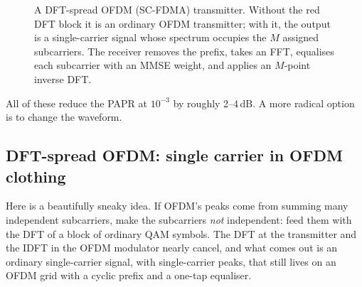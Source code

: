 \begin{figure}[H]\centering
{}
\caption{A DFT-spread OFDM (SC-FDMA) transmitter. Without the red DFT block it is an ordinary OFDM
transmitter; with it, the output is a single-carrier signal whose spectrum occupies the $M$ assigned
subcarriers. The receiver removes the prefix, takes an FFT, equalises each subcarrier with an MMSE weight,
and applies an $M$-point inverse DFT.}
\label{fig:ch17_dfts_tikz}
\end{figure}

All of these reduce the PAPR at $10^{-3}$ by roughly 2--4\,dB. A more radical option is to change the waveform.

\subsection{DFT-spread OFDM: single carrier in OFDM clothing}
\label{sec:ch17:dfts}

Here is a beautifully sneaky idea. If OFDM's peaks come from summing many independent subcarriers,
make the subcarriers \emph{not} independent: feed them with the DFT of a block of ordinary QAM
symbols. The DFT at the transmitter and the IDFT in the OFDM modulator nearly cancel, and what
comes out is an ordinary single-carrier signal, with single-carrier peaks, that still lives on an
OFDM grid with a cyclic prefix and a one-tap equaliser.

